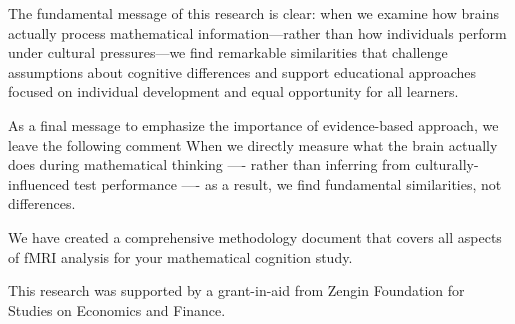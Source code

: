 \documentclass[pdflatex,sn-nature]{sn-jnl}%
\theoremstyle{thmstyleone}%
\theoremstyle{thmstyletwo}%
\theoremstyle{thmstylethree}%
\begin{document}
The fundamental message of this research is clear: when we examine how brains actually process mathematical information—rather than how individuals perform under cultural pressures—we find remarkable similarities that challenge assumptions about cognitive differences and support educational approaches focused on individual development and equal opportunity for all learners.

As a final message to emphasize the importance of evidence-based approach, we leave the following comment  When we directly measure what the brain actually does during mathematical thinking ---- rather than inferring from culturally-influenced test performance ---- as a result, we find fundamental similarities, not differences.

\backmatter


We have created a comprehensive methodology document that covers all aspects of fMRI analysis for your mathematical cognition study.


This research was supported by a grant-in-aid from Zengin Foundation for Studies on Economics and Finance.
\end{document}
